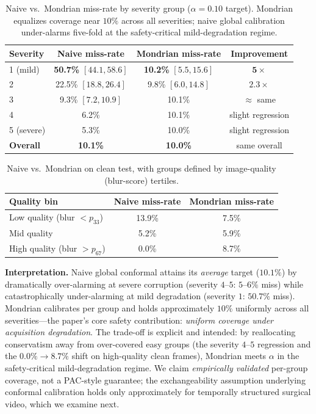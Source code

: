 \documentclass[letterpaper, 10 pt, conference]{ieeeconf}  %
\begin{document}
\begin{table}[t]
\caption{Naive vs.\ Mondrian miss-rate by severity group ($\alpha=0.10$ target). Mondrian equalizes coverage near $10\%$ across all severities; naive global calibration under-alarms five-fold at the safety-critical mild-degradation regime.}
\label{tab:mondrian_sev}
\centering
\small
\begin{tabular}{lccc}
\toprule
Severity & Naive miss-rate & Mondrian miss-rate & Improvement \\
\midrule
1 (mild)   & \textbf{50.7\%} $[44.1, 58.6]$ & \textbf{10.2\%} $[5.5, 15.6]$ & $\bm{5\times}$ \\
2          & 22.5\% $[18.8, 26.4]$ & 9.8\% $[6.0, 14.8]$ & $2.3\times$ \\
3          & 9.3\% $[7.2, 10.9]$ & 10.1\% & $\approx$ same \\
4          & 6.2\% & 10.1\% & slight regression \\
5 (severe) & 5.3\% & 10.0\% & slight regression \\
\midrule
\textbf{Overall} & \textbf{10.1\%} & \textbf{10.0\%} & same overall \\
\bottomrule
\end{tabular}
\end{table}

\begin{table}[t]
\caption{Naive vs.\ Mondrian on clean test, with groups defined by image-quality (blur-score) tertiles.}
\label{tab:mondrian_clean}
\centering
\footnotesize
\setlength{\tabcolsep}{5pt}
\begin{tabular}{lcc}
\toprule
Quality bin & Naive miss-rate & Mondrian miss-rate \\
\midrule
Low quality (blur $<p_{33}$)  & 13.9\% & 7.5\% \\
Mid quality                   & 5.2\%  & 5.9\% \\
High quality (blur $>p_{67}$) & 0.0\%  & 8.7\% \\
\bottomrule
\end{tabular}
\end{table}

\textbf{Interpretation.} Naive global conformal attains its \emph{average}
target ($10.1\%$) by dramatically over-alarming at severe corruption
(severity $4$--$5$: $5$--$6\%$ miss) while catastrophically under-alarming at
mild degradation (severity $1$: $50.7\%$ miss). Mondrian calibrates per group
and holds approximately $10\%$ uniformly across all severities---the paper's
core safety contribution: \emph{uniform coverage under acquisition
degradation}. The trade-off is explicit and intended: by reallocating
conservatism away from over-covered easy groups (the severity $4$--$5$
regression and the $0.0\% \rightarrow 8.7\%$ shift on high-quality clean
frames), Mondrian meets $\alpha$ in the safety-critical mild-degradation
regime. We claim \emph{empirically validated} per-group coverage, not a
PAC-style guarantee; the exchangeability assumption underlying conformal
calibration holds only approximately for temporally structured surgical
video, which we examine next.
\end{document}
